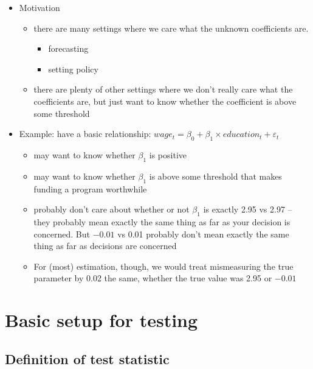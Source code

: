 \begin{itemize}
\item Motivation
\begin{itemize}
\item there are many settings where we care what the unknown
       coefficients are.
\begin{itemize}
\item forecasting
\item setting policy
\end{itemize}
\item there are plenty of other settings where we don't really care what
       the coefficients are, but just want to know whether the
       coefficient is above some threshold
\end{itemize}
\item Example: have a basic relationship: $wage_t = \beta_0 + \beta_1
     \times education_t + \varepsilon_t$
\begin{itemize}
\item may want to know whether $\beta_1$ is positive
\item may want to know whether $\beta_1$ is above some threshold that
       makes funding a program worthwhile
\item probably don't care about whether or not $\beta_1$ is exactly
       2.95 vs 2.97 -- they probably mean exactly the same thing as far
       as your decision is concerned.  But $-0.01$ vs 0.01 probably don't
       mean exactly the same thing as far as decisions are concerned
\item For (most) estimation, though, we would treat mismeasuring the
       true parameter by 0.02 the same, whether the true value was 2.95
       or $-0.01$
\end{itemize}
\end{itemize}
\section{Basic setup for testing}
\label{sec-2}
\subsection{Definition of test statistic}
\label{sec-2-1}

